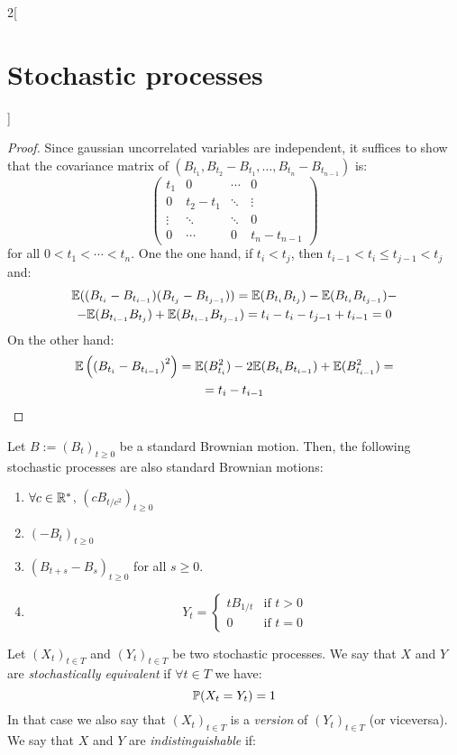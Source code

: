 \documentclass[../../../main_math.tex]{subfiles}
\begin{document}
\begin{multicols}{2}[\section{Stochastic processes}]
  \begin{proof}
    Since gaussian uncorrelated variables are independent, it suffices to show that the covariance matrix of $(B_{t_1}, B_{t_2}-B_{t_1}, \ldots, B_{t_n}-B_{t_{n-1}})$ is:
    $$
      \begin{pmatrix}
        t_1    & 0       & \cdots & 0            \\
        0      & t_2-t_1 & \ddots & \vdots       \\
        \vdots & \ddots  & \ddots & 0            \\
        0      & \cdots  & 0      & t_n- t_{n-1}
      \end{pmatrix}
    $$
    for all $0<t_1<\cdots<t_n$. One the one hand, if $t_i<t_j$, then $t_{i-1}<t_i\leq t_{j-1}<t_j$ and:
    \begin{multline*}
      \mathbb{E}((B_{t_i}-B_{t_{i-1}})(B_{t_j}-B_{t_{j-1}}))=\mathbb{E}(B_{t_i}B_{t_j})-\mathbb{E}(B_{t_i}B_{t_{j-1}})-\\-\mathbb{E}(B_{t_{i-1}}B_{t_j})+\mathbb{E}(B_{t_{i-1}}B_{t_{j-1}})=t_i-t_{i}-t_{j-1}+t_{i-1}=0
    \end{multline*}
    On the other hand:
    \begin{multline*}
      \mathbb{E}\left({(B_{t_i}-B_{t_{i-1}})}^2\right)= \mathbb{E}(B_{t_i}^2)-2\mathbb{E}(B_{t_i}B_{t_{i-1}})+\mathbb{E}(B_{t_{i-1}}^2)=\\=t_i-t_{i-1}
    \end{multline*}
  \end{proof}
  \begin{proposition}
    Let $B:={(B_t)}_{t\geq 0}$ be a standard Brownian motion. Then, the following stochastic processes are also standard Brownian motions:
    \begin{enumerate}
      \item $\forall c\in \mathbb{R}^*$, ${(cB_{t/c^2})}_{t\geq 0}$
      \item ${(-B_t)}_{t\geq 0}$
      \item ${(B_{t+s}-B_s)}_{t\geq 0}$ for all $s\geq 0$.
      \item $$
              Y_t = \begin{cases}
                t B_{1/t} & \text{if } t>0 \\
                0         & \text{if } t=0
              \end{cases}
            $$
    \end{enumerate}
  \end{proposition}
  \begin{definition}
    Let ${(X_t)}_{t\in T}$ and ${(Y_t)}_{t\in T}$ be two stochastic processes. We say that $X$ and $Y$ are \emph{stochastically equivalent} if $\forall t\in T$ we have: $$\mathbb{P}(X_t=Y_t)=1$$ In that case we also say that ${(X_t)}_{t\in T}$ is a \emph{version} of ${(Y_t)}_{t\in T}$ (or viceversa). We say that $X$ and $Y$ are \emph{indistinguishable} if: $$
$$
\end{definition}
\end{multicols}
\end{document}
